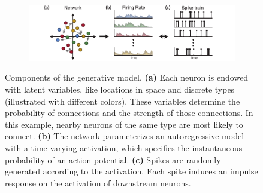 \begin{figure}[t]
  \centering
  \begin{subfigure}[t]{5.5in}
    \centering
    \includegraphics[width=\textwidth]{figures/ch3/figure1}
  \end{subfigure}
  \caption[Components of the network Hawkes model]{
     Components of the generative model. 
     \textbf{(a)} Each neuron is endowed with latent variables, like 
     locations in space and discrete types (illustrated with different colors).
     These variables determine the probability of connections and the 
     strength of those connections. In this example, nearby neurons of the same 
     type are most likely to connect.
     \textbf{(b)} The network parameterizes an autoregressive model 
     with a time-varying activation, which specifies the instantaneous probability 
     of an action potential.
     \textbf{(c)} Spikes are randomly generated according to the 
     activation. Each spike induces an impulse response on the activation 
     of downstream neurons.}
  \label{fig:fig1}
\end{figure}

